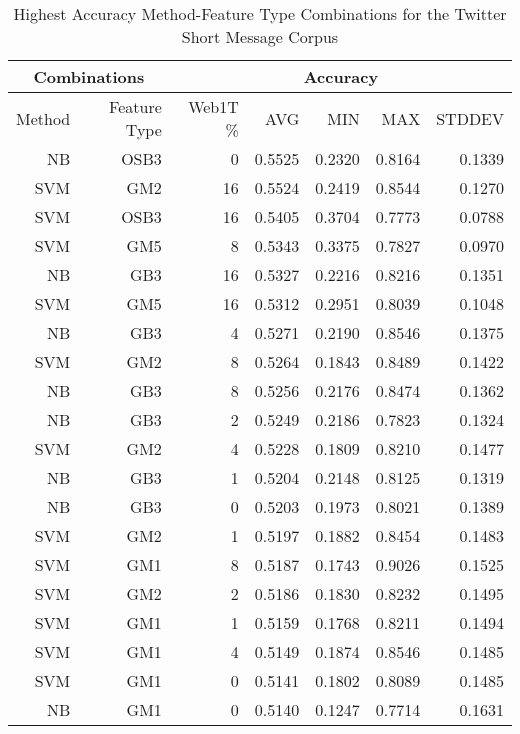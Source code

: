 	
	\begin{table}[htbp!]
	\begin{center}
			\begin{tabular}{ | r | r | r | r | r | r | r | }
			\hline
			\multicolumn{2}{|c|}{Combinations} & \multicolumn{5}{|c|}{Accuracy}\\
			\hline
			Method	& Feature Type 	& Web1T \%	& AVG 		& MIN		& MAX		& STDDEV\\ \hline 
			NB	& OSB3		& 0		& 0.5525	& 0.2320	& 0.8164	& 0.1339\\ \hline 
			SVM	& GM2		& 16		& 0.5524	& 0.2419	& 0.8544	& 0.1270\\ \hline 
			SVM	& OSB3		& 16		& 0.5405	& 0.3704	& 0.7773	& 0.0788\\ \hline 
			SVM	& GM5		& 8		& 0.5343	& 0.3375	& 0.7827	& 0.0970\\ \hline 
			NB	& GB3		& 16		& 0.5327	& 0.2216	& 0.8216	& 0.1351\\ \hline 
			SVM	& GM5		& 16		& 0.5312	& 0.2951	& 0.8039	& 0.1048\\ \hline 
			NB	& GB3		& 4		& 0.5271	& 0.2190	& 0.8546	& 0.1375\\ \hline 
			SVM	& GM2		& 8		& 0.5264	& 0.1843	& 0.8489	& 0.1422\\ \hline 
			NB	& GB3		& 8		& 0.5256	& 0.2176	& 0.8474	& 0.1362\\ \hline 
			NB	& GB3		& 2		& 0.5249	& 0.2186	& 0.7823	& 0.1324\\ \hline 
			SVM	& GM2		& 4		& 0.5228	& 0.1809	& 0.8210	& 0.1477\\ \hline 
			NB	& GB3		& 1		& 0.5204	& 0.2148	& 0.8125	& 0.1319\\ \hline 
			NB	& GB3		& 0		& 0.5203	& 0.1973	& 0.8021	& 0.1389\\ \hline 
			SVM	& GM2		& 1		& 0.5197	& 0.1882	& 0.8454	& 0.1483\\ \hline 
			SVM	& GM1		& 8		& 0.5187	& 0.1743	& 0.9026	& 0.1525\\ \hline 
			SVM	& GM2		& 2		& 0.5186	& 0.1830	& 0.8232	& 0.1495\\ \hline 
			SVM	& GM1		& 1		& 0.5159	& 0.1768	& 0.8211	& 0.1494\\ \hline 
			SVM	& GM1		& 4		& 0.5149	& 0.1874	& 0.8546	& 0.1485\\ \hline 
			SVM	& GM1		& 0		& 0.5141	& 0.1802	& 0.8089	& 0.1485\\ \hline 
			NB	& GM1		& 0		& 0.5140	& 0.1247	& 0.7714	& 0.1631\\ \hline  

			\end{tabular}
		\caption{Highest Accuracy Method-Feature Type Combinations for the Twitter Short Message Corpus}
		\label{tab:twitter-accuracy-filtered-ranked}
		\end{center}	
	\end{table}
	
